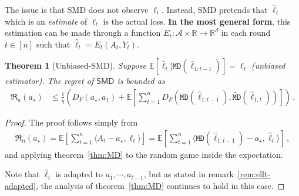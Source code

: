 \documentclass{article}
\theoremstyle{plain}
\newtheorem{theorem}{Theorem}
\theoremstyle{definition}
\newcommand{\R}{\mathbb R}
\newcommand{\Rd}{\mathbb{R}^d}
\newcommand{\Reg}{\mathfrak{R}}
\newcommand{\E}{\mathbb E}
\newcommand{\cA}{\mathcal A}
\newcommand{\fmd}{\texttt{MD}}
\newcommand{\tfmd}{\widetilde{\texttt{MD}}}
\newcommand{\smdalg}{\textsf{SMD}\xspace}
\newcommand{\hl}{\hat{\ell}\xspace}
\begin{document}
\marginnote{\textit{$\hl$ vs $\ell$}}
The issue is that \smdalg does not observe $\ell_t$.
Instead, \smdalg pretends that $\hl_t$ which is an \textit{estimate} of $\ell_t$ is the actual loss.
\textbf{In the most general form}, this estimation can be made through a function
$E_t: \cA \times \R \to \Rd$ in each round $t \in [n]$ such that $\hl_t = E_t(A_t, Y_t)$.
\begin{theorem}[Unbiased-\smdalg]\label{thm:SMD-unbiased}
    Suppose $\E[\hl_t|\fmd(\hl_{1:t-1})] = \ell_t$ (unbiased estimator).
    The regret of $\smdalg$ is bounded as
    \begin{align*}
        \Reg_n(a_\star)
         & \leq
        \frac{1}{\eta}\left(
        D_F(a_\star, a_1)
        +
        \E\left[
            \sum_{t=1}^{n} D_F(\fmd(\hl_{1:t-1}), \tfmd(\hl_{1:t}))
            \right]
        \right)\,.
    \end{align*}
\end{theorem}
\begin{proof}
    The proof follows simply from
    \begin{align*}
        \Reg_n(a_\star)
        =
        \E\left[
            \sum_{t=1}^{n} \langle A_t - a_\star, \ell_t\rangle
            \right]
        =
        \E\left[
            \sum_{t=1}^{n} \langle \fmd(\hl_{1:t-1}) - a_\star, \hl_t\rangle
            \right]\,,
    \end{align*}
    and applying theorem~\ref{thm:MD} to the random game inside the expectation.

    Note that $\hl_t$ is adapted to $a_1, \cdots, a_{t-1}$, but as stated in
    remark~\ref{rem:ellt-adapted}, the analysis of theorem~\ref{thm:MD}
    continues to hold in this case.
\end{proof}
\end{document}
